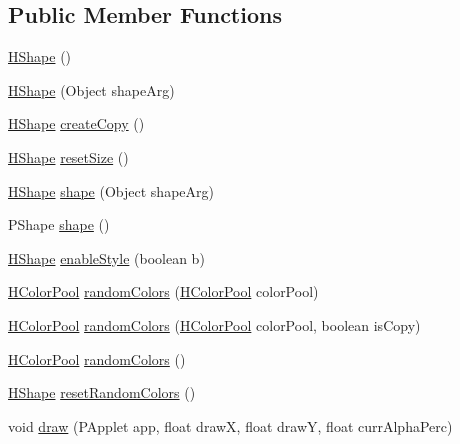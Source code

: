 \subsection*{Public Member Functions}
\begin{DoxyCompactItemize}
\item 
\hyperlink{classhype_1_1drawable_1_1_h_shape_a1a865f90aee8d8eb3dd92d5ba9402ddf}{H\-Shape} ()
\item 
\hyperlink{classhype_1_1drawable_1_1_h_shape_a53f04e8c4012ccb8577b1877637cd878}{H\-Shape} (Object shape\-Arg)
\item 
\hyperlink{classhype_1_1drawable_1_1_h_shape}{H\-Shape} \hyperlink{classhype_1_1drawable_1_1_h_shape_a3c87e6bdac6bbfeced9d25bfac8527b3}{create\-Copy} ()
\item 
\hyperlink{classhype_1_1drawable_1_1_h_shape}{H\-Shape} \hyperlink{classhype_1_1drawable_1_1_h_shape_a7b53aa8764021e6036540ceb0750541c}{reset\-Size} ()
\item 
\hyperlink{classhype_1_1drawable_1_1_h_shape}{H\-Shape} \hyperlink{classhype_1_1drawable_1_1_h_shape_ae495de06427f5e8349fb3bd0274f6c29}{shape} (Object shape\-Arg)
\item 
P\-Shape \hyperlink{classhype_1_1drawable_1_1_h_shape_a2df9d3cd17b1a313c9967ba38178883f}{shape} ()
\item 
\hyperlink{classhype_1_1drawable_1_1_h_shape}{H\-Shape} \hyperlink{classhype_1_1drawable_1_1_h_shape_a9495563e316f5aaf8faa2dee58197e0a}{enable\-Style} (boolean b)
\item 
\hyperlink{classhype_1_1colorist_1_1_h_color_pool}{H\-Color\-Pool} \hyperlink{classhype_1_1drawable_1_1_h_shape_afee75e474f4326fef8ede905140e69e9}{random\-Colors} (\hyperlink{classhype_1_1colorist_1_1_h_color_pool}{H\-Color\-Pool} color\-Pool)
\item 
\hyperlink{classhype_1_1colorist_1_1_h_color_pool}{H\-Color\-Pool} \hyperlink{classhype_1_1drawable_1_1_h_shape_a4667cf9bc56e6086abd938c61a6cc060}{random\-Colors} (\hyperlink{classhype_1_1colorist_1_1_h_color_pool}{H\-Color\-Pool} color\-Pool, boolean is\-Copy)
\item 
\hyperlink{classhype_1_1colorist_1_1_h_color_pool}{H\-Color\-Pool} \hyperlink{classhype_1_1drawable_1_1_h_shape_aa4a0712785805aa2775257996a70eac6}{random\-Colors} ()
\item 
\hyperlink{classhype_1_1drawable_1_1_h_shape}{H\-Shape} \hyperlink{classhype_1_1drawable_1_1_h_shape_aae1e34b239b134035a1f0ec05e35a7b7}{reset\-Random\-Colors} ()
\item 
void \hyperlink{classhype_1_1drawable_1_1_h_shape_a3c6e53cffebe30f3f46825a551a8fa73}{draw} (P\-Applet app, float draw\-X, float draw\-Y, float curr\-Alpha\-Perc)
\end{DoxyCompactItemize}
